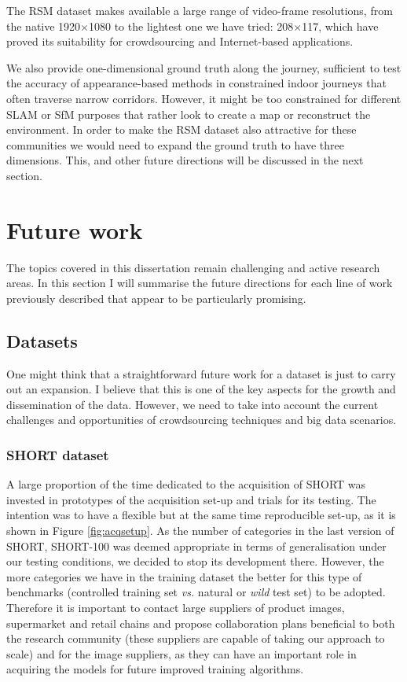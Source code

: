 The RSM dataset makes available a large range of video-frame resolutions, from the native 1920$\times$1080 to the lightest one we have tried: 208$\times$117, which have proved its suitability for crowdsourcing and Internet-based applications.

We also provide one-dimensional ground truth along the journey, sufficient to test the accuracy of appearance-based methods in constrained indoor journeys that often traverse narrow corridors. However, it might be too constrained for different SLAM or SfM purposes that rather look to create a map or reconstruct the environment. In order to make the RSM dataset also attractive for these communities we would need to expand the ground truth to have three dimensions. This, and other future directions will be discussed in the next section.

\section{Future work}
\label{sec:futurework}

The topics covered in this dissertation remain challenging and active research areas. In this section I will summarise the future directions for each line of work previously described that appear to be particularly promising.

\subsection{Datasets}

One might think that a straightforward future work for a dataset is just to carry out an expansion. I believe that this is one of the key aspects for the growth and dissemination of the data. However, we need to take into account the current challenges and opportunities of crowdsourcing techniques and big data scenarios.

\subsubsection{SHORT dataset}

A large proportion of the time dedicated to the acquisition of SHORT was invested in prototypes of the acquisition set-up and trials for its testing. The intention was to have a flexible but at the same time reproducible set-up, as it is shown in Figure  \ref{fig:acqsetup}. As the number of categories in the last version of SHORT, SHORT-100 was deemed appropriate in terms of generalisation under our testing conditions, we decided to stop its development there. However, the more categories we have in the training dataset the better for this type of benchmarks (controlled training set \textit{vs.} natural or \textit{wild} test set) to be adopted. Therefore it is important to contact large suppliers of product images, supermarket and retail chains and propose collaboration plans beneficial to both the research community (these suppliers are capable of taking our approach to scale) and for the image suppliers, as they can have an important role in acquiring the models for future improved training algorithms.

